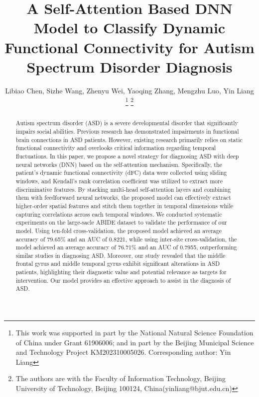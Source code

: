 \documentclass[journal,twoside,web]{ieeecolor}
\begin{document}
\title{A Self-Attention Based DNN Model to Classify Dynamic Functional Connectivity for Autism Spectrum Disorder Diagnosis}
\author{Libiao Chen, Sizhe Wang, Zhenyu Wei, Yaoqing Zhang, Mengzhu Luo, Yin Liang
\thanks{This work was supported in part by the National Natural Science Foundation of China under Grant 61906006; and in part by the Beijing Municipal Science and Technology Project KM202310005026. Corresponding author: Yin Liang}
\thanks{The authors are with the Faculty of Information Technology, Beijing University of Technology, Beijing 100124, China(yinliang@bjut.edu.cn)}}

\maketitle

\begin{abstract}
Autism spectrum disorder (ASD) is a severe developmental disorder that significantly impairs social abilities. Previous research has demonstrated impairments in functional brain connections in ASD patients. However,  existing research primarily relies on static functional connectivity and overlooks critical information regarding temporal fluctuations. In this paper, we propose a novel strategy for diagnosing ASD with deep neural networks (DNN) based on the self-attention mechanism. Specifically, the patient's dynamic functional connectivity (dFC) data were collected using sliding windows, and Kendall's rank correlation coefficient was utilized to extract more discriminative features. By stacking multi-head self-attention layers and combining them with feedforward neural networks, the proposed model can effectively extract higher-order spatial features and stitch them together in temporal dimensions while capturing correlations across each temporal windows. We conducted systematic experiments on the large-sacle ABIDE dataset to validate the performance of our model. Using ten-fold cross-validation, the proposed model achieved an average accuracy of 79.65\% and an AUC of 0.8221, while using inter-site cross-validation, the model achieved an average accuracy of 76.71\% and an AUC of 0.7955, outperforming similar studies in diagnosing ASD. Moreover, our study revealed that the middle frontal gyrus and middle temporal gyrus exhibit significant alterations in ASD patients, highlighting their diagnostic value and potential relevance as targets for intervention. Our model provides an effective approach to assist in the diagnosis of ASD.

\end{abstract}
\end{document}
